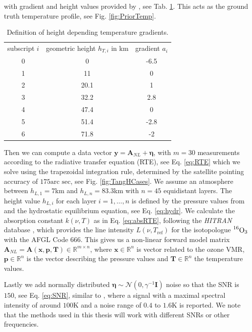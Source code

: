 with gradient and height values provided by \cite{atmosphere1976us}, see Tab. \ref{tab:tempGrad}.
This acts as the ground truth temperature profile, see Fig. \ref{fig:PriorTemp}.
\begin{table}
	\centering
	\begin{tabular}{ |c||c|c|  }
		\hline
		subscript $i$ & geometric height $h_{T,i}$ in km&gradient $a_i$\\
		\hhline{|=||=|=|}
		0& 0 & -6.5\\
		1& 11 & 0\\
		2& 20.1& 1\\
		3& 32.2& 2.8\\
		4& 47.4& 0\\
		5& 51.4& -2.8\\
		6& 71.8& -2\\
		\hline
	\end{tabular}
\caption[Height depending temperature gradients]{Definition of height depending temperature gradients.}
\label{tab:tempGrad}
\end{table}

Then we can compute a data vector $\bm{y} = \bm{A}_{NL} + \bm{\eta} $, with $m = 30$ measurements according to the radiative transfer equation (RTE), see Eq. \ref{eq:RTE} which we solve using the trapezoidal integration rule, determined by the satellite pointing accuracy of $175\text{arc sec}$, see Fig. \ref{fig:TangHCases}.
We assume an atmosphere between $h_{L,1}=7$km and $h_{L,n} = 83.3$km with $n = 45$ equidistant layers.
The height value $h_{L,i}$ for each layer $i = 1,\dots, n$ is defined by the pressure values from \cite{MLSdata} and the hydrostatic equilibrium equation, see Eq. \ref{eq:hydr}.
We calculate the absorption constant $k(\nu,T)$ as in Eq. \ref{eq:absRTE}, following the \textit{HITRAN} database \cite{gordon2022hitran2020}, which provides the line intensity $L(\nu,T_{\text{ref}})$ for the isotopologue $\prescript{16}{}{\text{O}}_3$ with the AFGL Code 666.
This gives us a non-linear forward model matrix $\bm{A}_{NL} = \bm{A}(\bm{x}, \bm{p}, \bm{T}) \in \mathbb{R}^{m \times n}$, where $\bm{x}\in \mathbb{R}^{n}$ is vector related to the ozone VMR, $\bm{p}\in \mathbb{R}^{n}$ is the vector describing the pressure values and $\bm{T}\in \mathbb{R}^{n}$ the temperature values.

Lastly we add normally distributed $\bm{\eta} \sim \mathcal{N}(0,\gamma^{-1} \bm{I})$ noise so that the SNR is $150$, see Eq. \ref{eq:SNR}, similar to \cite{Froidevaux2008snrozone}, where a signal with a maximal spectral intensity of around $100\text{K}$ and a noise range of $0.4$ to $1.6\text{K}$ is reported.
We note that the methods used in this thesis will work with different SNRs or other frequencies.

